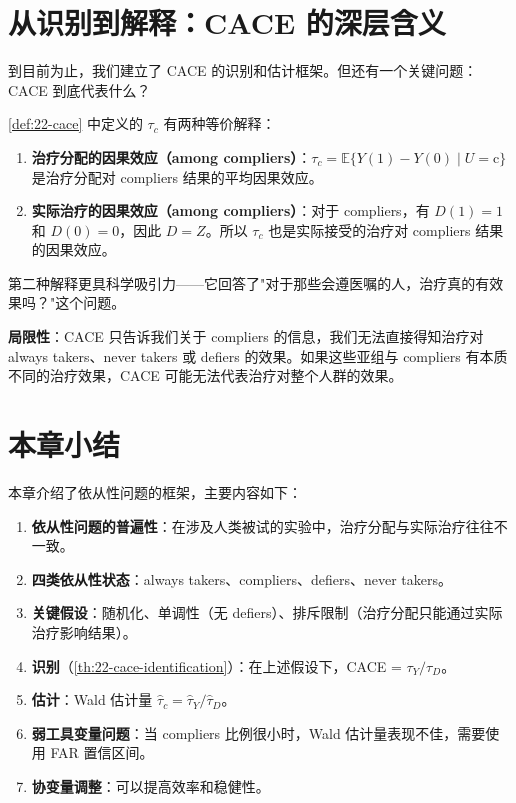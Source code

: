 \section{从识别到解释：CACE 的深层含义}\label{sec:22-cace-interpretation}

到目前为止，我们建立了 CACE 的识别和估计框架。但还有一个关键问题：CACE 到底代表什么？

\cref{def:22-cace} 中定义的 $\tau_c$ 有两种等价解释：

\begin{enumerate}
  \item \textbf{治疗分配的因果效应（among compliers）}：$\tau_c = \mathbb{E}\{Y(1) - Y(0) \mid U = \text{c}\}$ 是治疗分配对 compliers 结果的平均因果效应。
  \item \textbf{实际治疗的因果效应（among compliers）}：对于 compliers，有 $D(1) = 1$ 和 $D(0) = 0$，因此 $D = Z$。所以 $\tau_c$ 也是实际接受的治疗对 compliers 结果的因果效应。
\end{enumerate}

第二种解释更具科学吸引力——它回答了"对于那些会遵医嘱的人，治疗真的有效果吗？"这个问题。

\textbf{局限性}：CACE 只告诉我们关于 compliers 的信息，我们无法直接得知治疗对 always takers、never takers 或 defiers 的效果。如果这些亚组与 compliers 有本质不同的治疗效果，CACE 可能无法代表治疗对整个人群的效果。

\section{本章小结}\label{sec:22-summary}

本章介绍了依从性问题的框架，主要内容如下：

\begin{enumerate}
  \item \textbf{依从性问题的普遍性}：在涉及人类被试的实验中，治疗分配与实际治疗往往不一致。
  \item \textbf{四类依从性状态}：always takers、compliers、defiers、never takers。
  \item \textbf{关键假设}：随机化、单调性（无 defiers）、排斥限制（治疗分配只能通过实际治疗影响结果）。
  \item \textbf{识别}（\cref{th:22-cace-identification}）：在上述假设下，CACE = $\tau_Y / \tau_D$。
  \item \textbf{估计}：Wald 估计量 $\hat{\tau}_c = \hat{\tau}_Y / \hat{\tau}_D$。
  \item \textbf{弱工具变量问题}：当 compliers 比例很小时，Wald 估计量表现不佳，需要使用 FAR 置信区间。
  \item \textbf{协变量调整}：可以提高效率和稳健性。
\end{enumerate}

